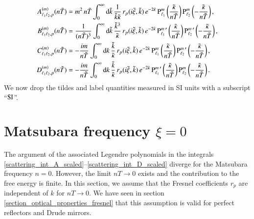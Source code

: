 \begin{align}
\label{scattering_int_A_scaled}
A_{\ell_1 \ell_2,p}^{(m)}(n\tilde{T}) &= m^2 \, n\tilde{T} \int_0^\infty \mathrm{d}\tilde{k} \, \frac{1}{\tilde{k} \tilde{\kappa}} \, r_p(i\tilde{\xi},\tilde{k}) \, e^{-2\tilde{\kappa}} \, {\text{P}_{\ell_1}^{m}}\left(\frac{\tilde{\kappa}}{n\tilde{T}}\right) {\text{P}_{\ell_2}^{m}}\left(-\frac{\tilde{\kappa}}{n\tilde{T}}\right), \\
\label{scattering_int_B_scaled}
B_{\ell_1 \ell_2,p}^{(m)}(n\tilde{T}) &= \frac{1}{(n\tilde{T})^3} \int_0^\infty \mathrm{d}\tilde{k} \, \frac{\tilde{k}^3}{\tilde{\kappa}} \, r_p(i\tilde{\xi},\tilde{k}) \, e^{-2\tilde{\kappa}} \, {\text{P}_{\ell_1}^{m}}^\prime\left(\frac{\tilde{\kappa}}{n\tilde{T}}\right) {\text{P}_{\ell_2}^{m}}^\prime\left(-\frac{\tilde{\kappa}}{n\tilde{T}}\right), \\
\label{scattering_int_C_scaled}
C_{\ell_1 \ell_2,p}^{(m)}(n\tilde{T}) &= -\frac{i m}{n\tilde{T}} \int_0^\infty \mathrm{d}k \, \frac{\tilde{k}}{\tilde{\kappa}} \, r_p(i\tilde{\xi},\tilde{k}) \, e^{-2\tilde{\kappa}} \, {\text{P}_{\ell_1}^{m}}\left(\frac{\tilde{\kappa}}{n\tilde{T}}\right) {\text{P}_{\ell_2}^{m}}^\prime\left(-\frac{\tilde{\kappa}}{n\tilde{T}}\right), \\
\label{scattering_int_D_scaled}
D_{\ell_1 \ell_2,p}^{(m)}(n\tilde{T}) &= -\frac{i m}{n\tilde{T}} \int_0^\infty \mathrm{d}k \, \frac{\tilde{k}}{\tilde{\kappa}} \, r_p(i\tilde{\xi},\tilde{k}) \, e^{-2\tilde{\kappa}} \, {\text{P}_{\ell_1}^{m}}^\prime\left(\frac{\tilde{\kappa}}{n\tilde{T}}\right) {\text{P}_{\ell_2}^{m}}\left(-\frac{\tilde{\kappa}}{n\tilde{T}}\right).
\end{align}
We now drop the tildes and label quantities measured in SI units with a subscript ``$\text{SI}$''.


\section{Matsubara frequency $\xi=0$}
\label{section_scattering_ps_xi0}

The argument of the associated Legendre polynomials in the integrals
\eqref{scattering_int_A_scaled}--\eqref{scattering_int_D_scaled} diverge for
the Matsubara frequency $n=0$. However, the limit $nT\to0$ exists and the
contribution to the free energy is finite. In this section, we assume that the
Fresnel coefficients $r_p$ are independent of $k$ for $nT \to 0$. We have seen
in section \ref{section_optical_properties_fresnel} that this assumption is
valid for perfect reflectors and Drude mirrors.

